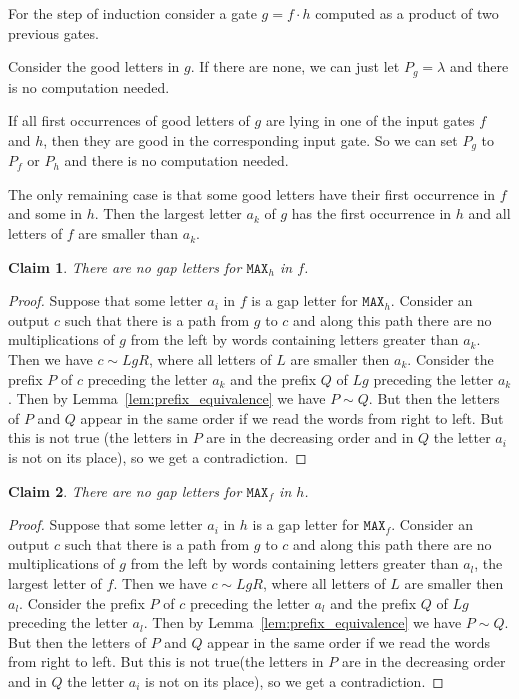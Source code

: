 \documentclass[11pt,letterpaper]{article}
\newtheorem{claim}{Claim}
\newcommand{\mmax}{\texttt{MAX}}
\begin{document}
For the step of induction consider a gate $g=f\cdot h$ computed as a product of two previous gates.

Consider the good letters in $g$. If there are none, we can just let $P_g=\lambda$ and there is no computation needed.

If all first occurrences of good letters of $g$ are lying in one of the input gates $f$ and $h$, then they are good in the corresponding input gate. So we can set $P_g$ to $P_f$ or $P_h$ and there is no computation needed.

The only remaining case is that some good letters have their first occurrence in $f$ and some in $h$. Then the largest letter $a_k$ of $g$ has the first occurrence in $h$ and all letters of $f$ are smaller than $a_k$.

\begin{claim} \label{cl: h is good}
There are no gap letters for $\mmax_h$ in $f$.
\end{claim}

\begin{proof}
Suppose that some letter $a_i$ in $f$ is a gap letter for $\mmax_h$. Consider an output $c$ such that there is a path from $g$ to $c$ and along this path there are no multiplications of $g$ from the left by words containing letters greater than $a_k$. Then we have $c \sim LgR$, where all letters of $L$ are smaller then $a_k$. Consider the prefix $P$ of $c$ preceding the letter $a_k$ and the prefix $Q$ of $Lg$ preceding the letter $a_k$.
Then by Lemma~\ref{lem:prefix_equivalence} we have $P \sim Q$. But then the letters of $P$ and $Q$ appear in the same order if we read the words from right to left. But this is not true (the letters in $P$ are in the decreasing order and in $Q$ the letter $a_i$ is not on its place), so we get a contradiction.
\end{proof}

\begin{claim}\label{cl: f is good}
There are no gap letters for $\mmax_f$ in $h$.
\end{claim}

\begin{proof}
Suppose that some letter $a_i$ in $h$ is a gap letter for $\mmax_f$. Consider an output $c$ such that there is a path from $g$ to $c$ and along this path there are no multiplications of $g$ from the left by words containing letters greater than $a_l$, the largest letter of $f$. Then we have $c \sim LgR$, where all letters of $L$ are smaller then $a_l$. Consider the prefix $P$ of $c$ preceding the letter $a_l$ and the prefix $Q$ of $Lg$ preceding the letter $a_l$.
Then by Lemma~\ref{lem:prefix_equivalence} we have $P \sim Q$. But then the letters of $P$ and $Q$ appear in the same order if we read the words from right to left. But this is not true(the letters in $P$ are in the decreasing order and in $Q$ the letter $a_i$ is not on its place), so we get a contradiction.
\end{proof}
\end{document}
